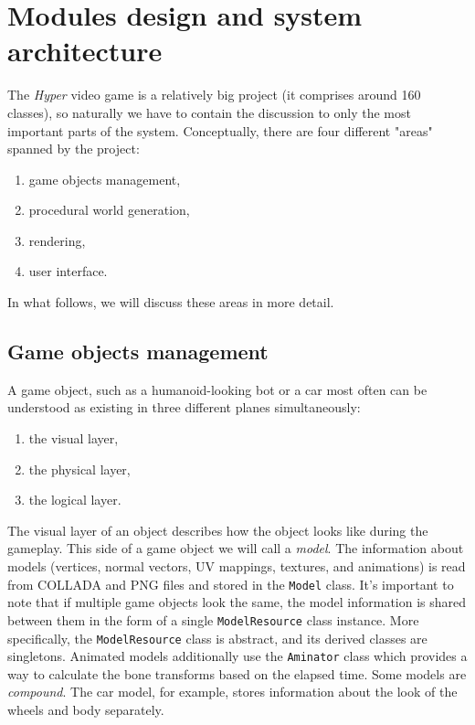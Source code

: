 \section{Modules design and system architecture}


The \textit{Hyper} video game is a relatively big project (it comprises around 160 classes), so naturally we have to contain the discussion to only the most important parts of the system.
Conceptually, there are four different "areas" spanned by the project:
\begin{enumerate}
    \item game objects management,
    \item procedural world generation,
    \item rendering,
    \item user interface.
\end{enumerate}

In what follows, we will discuss these areas in more detail.

\subsection{Game objects management}
A game object, such as a humanoid-looking bot or a car most often can be understood as existing in three different planes simultaneously:
\begin{enumerate}
    \item the visual layer,
    \item the physical layer,
    \item the logical layer.
\end{enumerate}
The visual layer of an object describes how the object looks like during the gameplay.
This side of a game object we will call a \textit{model}.
The information about models (vertices, normal vectors, UV mappings, textures, and animations) is read from COLLADA and PNG files and stored in the \texttt{Model} class.
It's important to note that if multiple game objects look the same, the model information is shared between them in the form of a single \texttt{ModelResource} class instance.
More specifically, the \texttt{ModelResource} class is abstract, and its derived classes are singletons.
Animated models additionally use the \texttt{Aminator} class which provides a way to calculate the bone transforms based on the elapsed time.
Some models are \textit{compound}.
The car model, for example, stores information about the look of the wheels and body separately.

